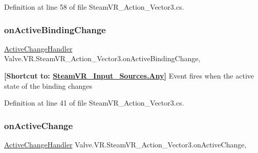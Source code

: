 Definition at line 58 of file Steam\+V\+R\+\_\+\+Action\+\_\+\+Vector3.\+cs.

\mbox{\label{class_valve_1_1_v_r_1_1_steam_v_r___action___vector3_adf4506e3d4074903743a4f8e059b3f8a}} 
\subsubsection{\texorpdfstring{onActiveBindingChange}{onActiveBindingChange}}
{\footnotesize\ttfamily \mbox{\hyperlink{class_valve_1_1_v_r_1_1_steam_v_r___action___vector3_a47d6c1c558fb45841cd626df9ab3dcb9}{Active\+Change\+Handler}} Valve.\+V\+R.\+Steam\+V\+R\+\_\+\+Action\+\_\+\+Vector3.\+on\+Active\+Binding\+Change\hspace{0.3cm}{\ttfamily [add]}, {\ttfamily [remove]}}



{\bfseries{\mbox{[}Shortcut to\+: \mbox{\hyperlink{namespace_valve_1_1_v_r_a82e5bf501cc3aa155444ee3f0662853faed36a1ef76a59ee3f15180e0441188ad}{Steam\+V\+R\+\_\+\+Input\+\_\+\+Sources.\+Any}}\mbox{]}}} Event fires when the active state of the binding changes 



Definition at line 41 of file Steam\+V\+R\+\_\+\+Action\+\_\+\+Vector3.\+cs.

\mbox{\label{class_valve_1_1_v_r_1_1_steam_v_r___action___vector3_a4e3133aec6465e1d5b17bd695ae9a579}} 
\subsubsection{\texorpdfstring{onActiveChange}{onActiveChange}}
{\footnotesize\ttfamily \mbox{\hyperlink{class_valve_1_1_v_r_1_1_steam_v_r___action___vector3_a47d6c1c558fb45841cd626df9ab3dcb9}{Active\+Change\+Handler}} Valve.\+V\+R.\+Steam\+V\+R\+\_\+\+Action\+\_\+\+Vector3.\+on\+Active\+Change\hspace{0.3cm}{\ttfamily [add]}, {\ttfamily [remove]}}



